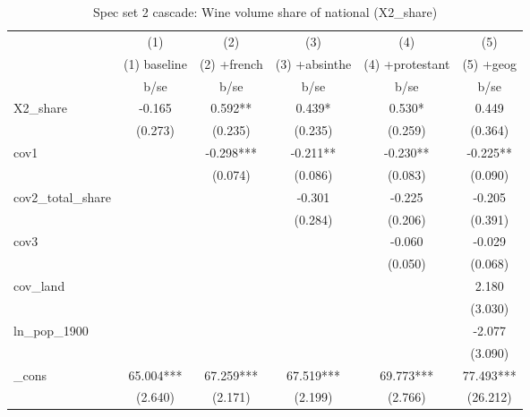 \begin{table}[htbp]\centering
\def\sym#1{\ifmmode^{#1}\else\(^{#1}\)\fi}
\caption{Spec set 2 cascade: Wine volume share of national (X2\_share) \label{tab:cascade2}}
\begin{tabular}{l*{5}{c}}
\toprule
            &\multicolumn{1}{c}{(1)}&\multicolumn{1}{c}{(2)}&\multicolumn{1}{c}{(3)}&\multicolumn{1}{c}{(4)}&\multicolumn{1}{c}{(5)}\\
            &\multicolumn{1}{c}{(1) baseline}&\multicolumn{1}{c}{(2) +french}&\multicolumn{1}{c}{(3) +absinthe}&\multicolumn{1}{c}{(4) +protestant}&\multicolumn{1}{c}{(5) +geog}\\
            &        b/se   &        b/se   &        b/se   &        b/se   &        b/se   \\
\midrule
X2\_share    &      -0.165   &       0.592** &       0.439*  &       0.530*  &       0.449   \\
            &     (0.273)   &     (0.235)   &     (0.235)   &     (0.259)   &     (0.364)   \\
cov1        &               &      -0.298***&      -0.211** &      -0.230** &      -0.225** \\
            &               &     (0.074)   &     (0.086)   &     (0.083)   &     (0.090)   \\
cov2\_total\_share&               &               &      -0.301   &      -0.225   &      -0.205   \\
            &               &               &     (0.284)   &     (0.206)   &     (0.391)   \\
cov3        &               &               &               &      -0.060   &      -0.029   \\
            &               &               &               &     (0.050)   &     (0.068)   \\
cov\_land    &               &               &               &               &       2.180   \\
            &               &               &               &               &     (3.030)   \\
ln\_pop\_1900 &               &               &               &               &      -2.077   \\
            &               &               &               &               &     (3.090)   \\
\_cons      &      65.004***&      67.259***&      67.519***&      69.773***&      77.493***\\
            &     (2.640)   &     (2.171)   &     (2.199)   &     (2.766)   &    (26.212)   \\

\end{tabular}
\end{table}
